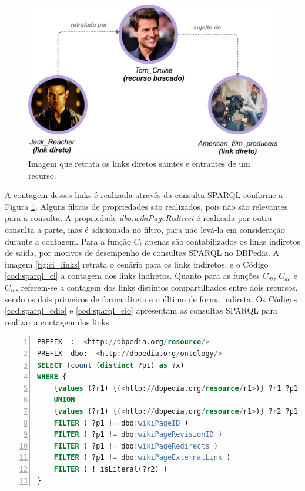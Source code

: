 \begin{figure}
	\centering
	\includegraphics[scale=0.35]{imagens/cd_links.png}
	\caption{Imagem que retrata os links diretos saintes e entrantes de um recurso.}
	\label{fig:cd_links}
\end{figure}

A contagem desses links é realizada através da consulta \ac{SPARQL} conforme a Figura \ref{fig:cd_links}. Alguns filtros de propriedades são realizados, pois não são relevantes para a consulta. A propriedade \textit{dbo:wikiPageRedirect} é realizada por outra consulta a parte, mas é adicionada no filtro, para não levá-la em consideração durante a contagem. Para a função $C_i$ apenas são contabilizados os links indiretos de saída, por motivos de desempenho de consultas SPARQL no DBPedia. A imagem \ref{fig:ci_links} retrata o cenário para os links indiretos, e o Código \ref{cod:sparql_ci} a contagem dos links indiretos. Quanto para as funções $C_{di}$, $C_{do}$ e $C_{io}$, referem-se a contagem dos links distintos compartilhados entre dois recursos, sendo os dois primeiros de forma direta e o último de forma indireta. Os Códigos \ref{cod:sparql_cdio} e \ref{cod:sparql_cio} apresentam as consultas \ac{SPARQL} para realizar a contagem dos links.

\begin{lstlisting}[caption=Consulta SPARQL para contagem de links diretos, language=SQL, frame=single, label={cod:sparql_cd}, float, numbers=left]
PREFIX  :  <http://dbpedia.org/resource/>
PREFIX  dbo:  <http://dbpedia.org/ontology/>
SELECT (count (distinct ?p1) as ?x)
WHERE {
	{values (?r1) {(<http://dbpedia.org/resource/r1>)} ?r1 ?p1 ?r2 . FILTER (?r1 != ?r2)}
	UNION
	{values (?r1) {(<http://dbpedia.org/resource/r1>)} ?r2 ?p1 ?r1 . FILTER (?r1 != ?r2)}
	FILTER ( ?p1 != dbo:wikiPageID )
	FILTER ( ?p1 != dbo:wikiPageRevisionID )
	FILTER ( ?p1 != dbo:wikiPageRedirects )
	FILTER ( ?p1 != dbo:wikiPageExternalLink )
	FILTER ( ! isLiteral(?r2) )
}
\end{lstlisting}

